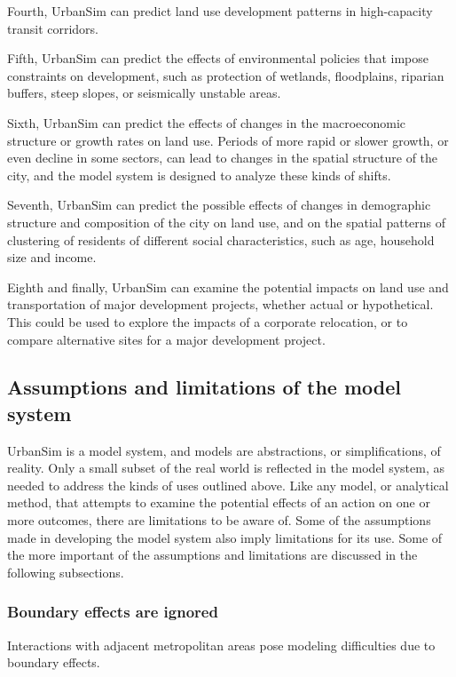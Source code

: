 Fourth, UrbanSim can predict land use development patterns in high-capacity transit corridors.

Fifth, UrbanSim can predict the effects of environmental policies that impose constraints on development, such as protection of wetlands, floodplains, riparian buffers, steep slopes, or seismically unstable areas.

Sixth, UrbanSim can predict the effects of changes in the macroeconomic structure or growth rates on land use. Periods of more rapid or slower growth, or even decline in some sectors, can lead to changes in the spatial structure of the city, and the model system is designed to analyze these kinds of shifts.

Seventh, UrbanSim can predict the possible effects of changes in demographic structure and composition of the city on land use, and on the spatial patterns of clustering of residents of different social characteristics, such as age, household size and income.

Eighth and finally, UrbanSim can examine the potential impacts on land use and transportation of major development projects, whether actual or hypothetical. This could be used to explore the impacts of a corporate relocation, or to compare alternative sites for a major development project.


\subsection{Assumptions and limitations of the model system}

UrbanSim is a model system, and models are abstractions, or simplifications, of reality. Only a small subset of the real world is reflected in the model system, as needed to address the kinds of uses outlined above. Like any model, or analytical method, that attempts to examine the potential effects of an action on one or more outcomes, there are limitations to be aware of. Some of the assumptions made in developing the model system also imply limitations for its use. Some of the more
important of the assumptions and limitations are discussed in the following subsections.

\subsubsection{Boundary effects are ignored}

Interactions with adjacent metropolitan areas pose
modeling difficulties due to boundary effects.

